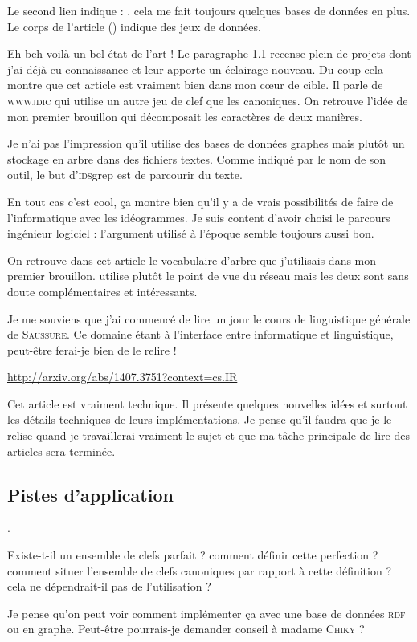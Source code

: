 Le second lien indique : . cela me fait toujours quelques bases de données en plus. Le corps de l'article () indique des jeux de données.

Eh beh voilà un bel état de l'art ! Le paragraphe 1.1 recense plein de projets dont j'ai déjà eu connaissance et leur apporte un éclairage nouveau. Du coup cela montre que cet article est vraiment bien dans mon cœur de cible. Il parle de \textsc{wwwjdic} qui utilise un autre jeu de clef que les canoniques. On retrouve l'idée de mon premier brouillon qui décomposait les caractères de deux manières.

Je n'ai pas l'impression qu'il utilise des bases de données graphes mais plutôt un stockage en arbre dans des fichiers textes. Comme indiqué par le nom de son outil, le but d'\textsc{ids}grep est de parcourir du texte.

En tout cas c'est cool, ça montre bien qu'il y a de vrais possibilités de faire de l'informatique avec les idéogrammes. Je suis content d'avoir choisi le parcours ingénieur logiciel : l'argument utilisé à l'époque semble toujours aussi bon.

On retrouve dans cet article le vocabulaire d'arbre que j'utilisais dans mon premier brouillon.  utilise plutôt le point de vue du réseau mais les deux sont sans doute complémentaires et intéressants.

Je me souviens que j'ai commencé de lire un jour le cours de linguistique générale de \textsc{Saussure}. Ce domaine étant à l'interface entre informatique et linguistique, peut-être ferai-je bien de le relire !

\url{http://arxiv.org/abs/1407.3751?context=cs.IR}

Cet article est vraiment technique. Il présente quelques nouvelles idées et surtout les détails techniques de leurs implémentations. Je pense qu'il faudra que je le relise quand je travaillerai vraiment le sujet et que ma tâche principale de lire des articles sera terminée.

\subsection{Pistes d'application}
.

Existe-t-il un ensemble de clefs parfait ? comment définir cette perfection ? comment situer l'ensemble de clefs canoniques par rapport à cette définition ? cela ne dépendrait-il pas de l'utilisation ?

Je pense qu'on peut voir comment implémenter ça avec une base de données \textsc{rdf} ou en graphe. Peut-être pourrais-je demander conseil à madame \textsc{Chiky} ?
